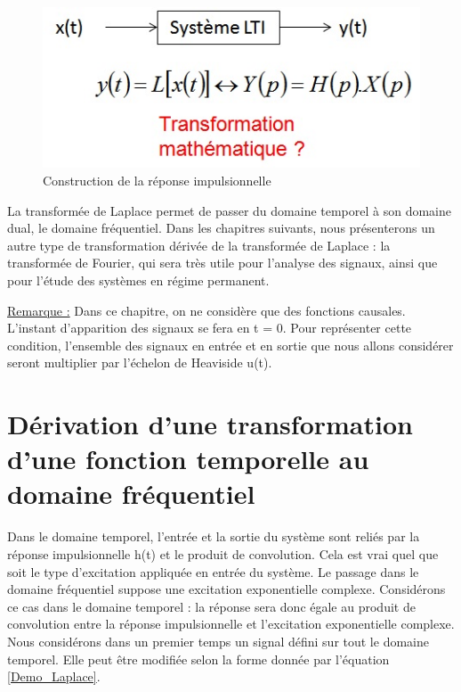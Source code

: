 \documentclass[]{report}
\begin{document}
	\begin{figure}[h!]
		\centering
		\includegraphics[scale=0.5]{images/Position_Pb_Laplace.jpg}
		\caption{Construction de la réponse impulsionnelle}	
		\label{Fig:Position_Pb_Laplace} 
	\end{figure}
	
	 La transformée de Laplace permet de passer du domaine temporel à son domaine dual, le domaine fréquentiel. Dans les chapitres suivants, nous présenterons un autre type de transformation dérivée de la transformée de Laplace : la transformée de Fourier, qui sera très utile pour l'analyse des signaux, ainsi que pour l'étude des systèmes en régime permanent.
	
	\vspace{0.5\baselineskip}
	\underline{Remarque :}
	Dans ce chapitre, on ne considère que des fonctions causales. L'instant d'apparition des signaux se fera en t = 0. Pour représenter cette condition, l'ensemble des signaux en entrée et en sortie que nous allons considérer seront multiplier par l'échelon de Heaviside u(t).
	\vspace{1\baselineskip}
	
	\section{Dérivation d'une transformation d'une fonction temporelle au domaine fréquentiel}
	Dans le domaine temporel, l'entrée et la sortie du système sont reliés par la réponse impulsionnelle h(t) et le produit de convolution. Cela est vrai quel que soit le type d'excitation appliquée en entrée du système. Le passage dans le domaine fréquentiel suppose une excitation exponentielle complexe. Considérons ce cas dans le domaine temporel : la réponse sera donc égale au produit de convolution entre la réponse impulsionnelle et l'excitation exponentielle complexe. Nous considérons dans un premier temps un signal défini sur tout le domaine temporel. Elle peut être modifiée selon la forme donnée par l'équation \ref{Demo_Laplace}.
	
\end{document}
